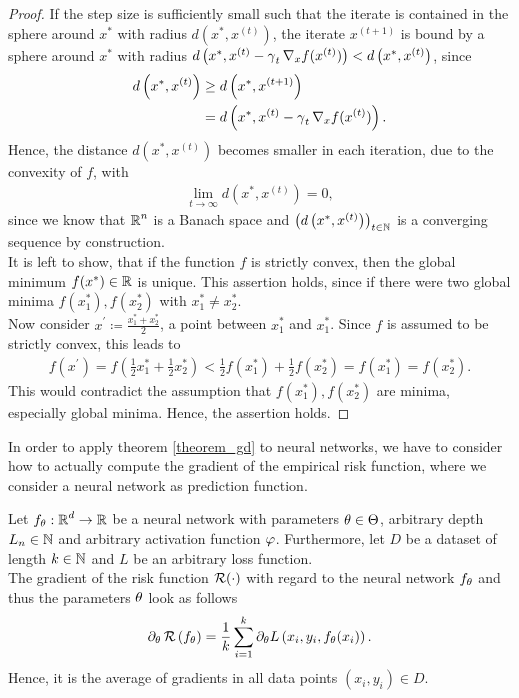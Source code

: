 \begin{proof}
If the step size is sufficiently small such that the iterate is contained in the sphere around $x^{\ast}$ with radius $d\left(x^{\ast}, x^{(t)}\right)$,
the iterate $x^{(t+1)}$ is bound by a sphere around $x^{\ast}$ with radius $d\left(x^{\ast}, x^{(t)} - \operatorname{\gamma}_t \nabla_x f(x^{(t)})\right) < d\left(x^{\ast}, x^{(t)}\right)$, since
\begin{align*}
d\left(x^{\ast}, x^{(t)}\right) &\geq d\left(x^{\ast}, x^{(t+1)}\right)\\
&= d\left(x^{\ast}, x^{(t)} - \operatorname{\gamma}_t \nabla_x f(x^{(t)})\right).
\end{align*}
Hence, the distance $d(x^{\ast}, x^{(t)})$ becomes smaller in each iteration, due to the convexity of $f$, with
\begin{align*}
\lim_{t\to\infty} d\left(x^{\ast}, x^{(t)}\right) = 0,
\end{align*}
since we know that $\operatorname{\mathbb{R}}^n$ is a Banach space and $\left(d\left(x^{\ast}, x^{(t)}\right)\right)_{t\in\operatorname{\mathbb{N}}}$ is a converging sequence by construction.\\
It is left to show, that if the function $f$ is strictly convex, then the global minimum $f(x^{\ast})\in\operatorname{\mathbb{R}}$ is unique. This assertion holds, since if there were two global minima $f\left(x_1^{\ast}\right), f\left(x_2^{\ast}\right)$ with $x_1^{\ast} \neq x_2^{\ast}$.\\
Now consider $x^{\prime} \coloneqq \frac{x_1^{\ast} + x_2^{\ast}}{2}$, a point between $x_1^{\ast}$ and $x_1^{\ast}$. Since $f$ is assumed to be strictly convex, this leads to
\begin{align*}
f\left(x^{\prime} \right) = f\left(\frac{1}{2}x_1^{\ast} + \frac{1}{2} x_2^{\ast}\right) < \frac{1}{2} f\left(x_1^{\ast} \right) + \frac{1}{2} f\left(x_2^{\ast}\right) = f\left(x_1^{\ast}\right) = f\left(x_2^{\ast}\right).
\end{align*}
This would contradict the assumption that $f\left(x_1^{\ast}\right), f\left(x_2^{\ast}\right)$ are minima, especially global minima. Hence, the assertion holds.
\end{proof}


In order to apply theorem \ref{theorem_gd} to neural networks, we have to consider how to actually compute the gradient of the empirical risk function, where we consider a neural network as prediction function.


\begin{lemma}\label{nn_gradient}
Let $f_\theta:\operatorname{\mathbb{R}}^d\to \operatorname{\mathbb{R}}$ be a neural network with parameters $\theta\in\operatorname{\Theta}$, arbitrary depth $L_n\in\operatorname{\mathbb{N}}$ and arbitrary activation function $\operatorname{\varphi}$. Furthermore, let $D$ be a dataset of length $k\in \operatorname{\mathbb{N}}$ and $L$ be an arbitrary loss function.\\
The gradient of the risk function $\operatorname{\mathcal{R}}(\cdot)$ with regard to the neural network $f_\theta$ and thus the parameters $\theta$ look as follows
\begin{align*}
\partial_\theta \operatorname{\mathcal{R}} \left(f_{\theta}\right) = \frac{1}{k} \sum_{i=1}^{k} \partial_\theta L\left(x_i, y_i, f_\theta(x_i)\right).
\end{align*}
Hence, it is the average of gradients in all data points $(x_i,y_i) \in D$.
\end{lemma}


